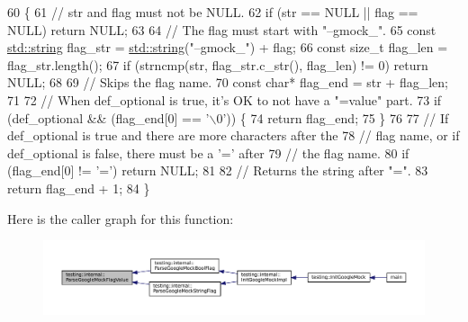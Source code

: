 \begin{DoxyCode}
60                                                                \{
61   \textcolor{comment}{// str and flag must not be NULL.}
62   \textcolor{keywordflow}{if} (str == NULL || flag == NULL) \textcolor{keywordflow}{return} NULL;
63 
64   \textcolor{comment}{// The flag must start with "--gmock\_".}
65   \textcolor{keyword}{const} \hyperlink{namespacetesting_1_1internal_a8e8ff5b11e64078831112677156cb111}{std::string} flag\_str = \hyperlink{namespacetesting_1_1internal_a8e8ff5b11e64078831112677156cb111}{std::string}(\textcolor{stringliteral}{"--gmock\_"}) + flag;
66   \textcolor{keyword}{const} \textcolor{keywordtype}{size\_t} flag\_len = flag\_str.length();
67   \textcolor{keywordflow}{if} (strncmp(str, flag\_str.c\_str(), flag\_len) != 0) \textcolor{keywordflow}{return} NULL;
68 
69   \textcolor{comment}{// Skips the flag name.}
70   \textcolor{keyword}{const} \textcolor{keywordtype}{char}* flag\_end = str + flag\_len;
71 
72   \textcolor{comment}{// When def\_optional is true, it's OK to not have a "=value" part.}
73   \textcolor{keywordflow}{if} (def\_optional && (flag\_end[0] == \textcolor{charliteral}{'\(\backslash\)0'})) \{
74     \textcolor{keywordflow}{return} flag\_end;
75   \}
76 
77   \textcolor{comment}{// If def\_optional is true and there are more characters after the}
78   \textcolor{comment}{// flag name, or if def\_optional is false, there must be a '=' after}
79   \textcolor{comment}{// the flag name.}
80   \textcolor{keywordflow}{if} (flag\_end[0] != \textcolor{charliteral}{'='}) \textcolor{keywordflow}{return} NULL;
81 
82   \textcolor{comment}{// Returns the string after "=".}
83   \textcolor{keywordflow}{return} flag\_end + 1;
84 \}
\end{DoxyCode}
Here is the caller graph for this function\+:
\nopagebreak
\begin{figure}[H]
\begin{center}
\leavevmode
\includegraphics[width=350pt]{namespacetesting_1_1internal_af9eac3bda47b1fa0b8e43d1d1d3a0b16_icgraph}
\end{center}
\end{figure}
\mbox{\label{namespacetesting_1_1internal_afb359266feb817d9943854b76574817d}} 
